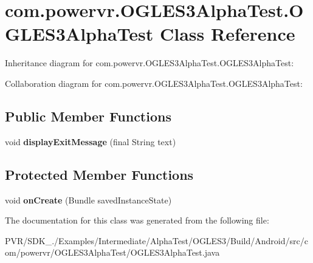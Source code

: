 \hypertarget{classcom_1_1powervr_1_1_o_g_l_e_s3_alpha_test_1_1_o_g_l_e_s3_alpha_test}{\section{com.\+powervr.\+O\+G\+L\+E\+S3\+Alpha\+Test.\+O\+G\+L\+E\+S3\+Alpha\+Test Class Reference}
\label{classcom_1_1powervr_1_1_o_g_l_e_s3_alpha_test_1_1_o_g_l_e_s3_alpha_test}
}


Inheritance diagram for com.\+powervr.\+O\+G\+L\+E\+S3\+Alpha\+Test.\+O\+G\+L\+E\+S3\+Alpha\+Test\+:


Collaboration diagram for com.\+powervr.\+O\+G\+L\+E\+S3\+Alpha\+Test.\+O\+G\+L\+E\+S3\+Alpha\+Test\+:
\subsection*{Public Member Functions}
\begin{DoxyCompactItemize}
\item 
\hypertarget{classcom_1_1powervr_1_1_o_g_l_e_s3_alpha_test_1_1_o_g_l_e_s3_alpha_test_ade5e2cd9cc8b0a0333ce16ce76427b97}{void {\bfseries display\+Exit\+Message} (final String text)}\label{classcom_1_1powervr_1_1_o_g_l_e_s3_alpha_test_1_1_o_g_l_e_s3_alpha_test_ade5e2cd9cc8b0a0333ce16ce76427b97}

\end{DoxyCompactItemize}
\subsection*{Protected Member Functions}
\begin{DoxyCompactItemize}
\item 
\hypertarget{classcom_1_1powervr_1_1_o_g_l_e_s3_alpha_test_1_1_o_g_l_e_s3_alpha_test_a70bb24a111cb6f618fa7383801cf1bfa}{void {\bfseries on\+Create} (Bundle saved\+Instance\+State)}\label{classcom_1_1powervr_1_1_o_g_l_e_s3_alpha_test_1_1_o_g_l_e_s3_alpha_test_a70bb24a111cb6f618fa7383801cf1bfa}

\end{DoxyCompactItemize}


The documentation for this class was generated from the following file\+:\begin{DoxyCompactItemize}
\item 
P\+V\+R/\+S\+D\+K\+\_./\+Examples/\+Intermediate/\+Alpha\+Test/\+O\+G\+L\+E\+S3/\+Build/\+Android/src/com/powervr/\+O\+G\+L\+E\+S3\+Alpha\+Test/O\+G\+L\+E\+S3\+Alpha\+Test.\+java\end{DoxyCompactItemize}
